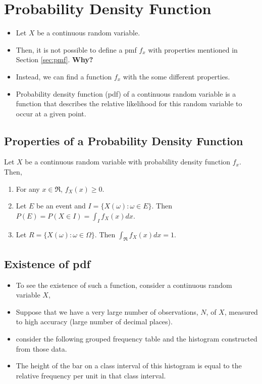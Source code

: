 \documentclass[]{book}
\providecommand{\tightlist}{%
  \setlength{\itemsep}{0pt}\setlength{\parskip}{0pt}}
\begin{document}
\hypertarget{probability-density-function}{%
\section{Probability Density Function}\label{probability-density-function}}

\begin{itemize}
\item
  Let \(X\) be a continuous random variable.
\item
  Then, it is not possible to define a pmf \(f_x\) with properties mentioned in Section \ref{sec:pmf}. \textbf{Why?}
\item
  Instead, we can find a function \(f_x\) with the some different properties.
\item
  Probability density function (pdf) of a continuous random variable is a function that describes the relative likelihood for this random variable to occur at a given point.
\end{itemize}

\hypertarget{properties-of-a-probability-density-function}{%
\subsection{Properties of a Probability Density Function}\label{properties-of-a-probability-density-function}}

\label{sec:pdfproperties}

Let \(X\) be a continuous random variable with probability density function \(f_x\). Then,

\begin{enumerate}
\def\labelenumi{\arabic{enumi}.}
\tightlist
\item
  For any \(x\in \Re\), \(f_X(x) \geq0\).
\item
  Let \(E\) be an event and \(I= \{X(\omega):\omega \in E\}.\) Then \(P(E) = P(X\in I) = \int_If_X(x)dx.\)
\item
  Let \(R = \{X(\omega):\omega \in \Omega\}.\) Then \(\int_\Re f_X(x)dx= 1.\)
\end{enumerate}

\hypertarget{existence-of-pdf}{%
\subsection{Existence of pdf}\label{existence-of-pdf}}

\begin{itemize}
\tightlist
\item
  To see the existence of such a function, consider a continuous random variable \(X\),
\item
  Suppose that we have a very large number of observations, \(N\), of \(X\), measured to high accuracy (large number of decimal places).
\item
  consider the following grouped frequency table and the histogram constructed from those data.
\item
  The height of the bar on a class interval of this histogram is equal to the relative frequency per unit in that class interval.
\end{itemize}
\end{document}
